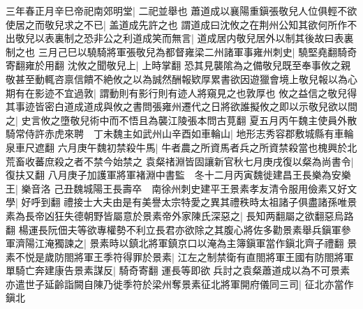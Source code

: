 三年春正月辛巳帝祀南郊明堂|{
	二祀並舉也}
蕭道成以襄陽重鎭張敬兒人位俱輕不欲使居之而敬兒求之不已|{
	盖道成先許之也}
謂道成曰沈攸之在荆州公知其欲何所作不出敬兒以表裏制之恐非公之利道成笑而無言|{
	道成居内敬兒居外以制其後故曰表裏制之也}
三月己巳以驍騎將軍張敬兒為都督雍梁二州諸軍事雍州刺史|{
	驍堅堯翻騎奇寄翻雍於用翻}
沈攸之聞敬兒上|{
	上時掌翻}
恐其見襲隂為之備敬兒既至奉事攸之親敬甚至動輒咨禀信饋不絶攸之以為誠然酬報欵厚累書欲因遊獵會境上敬兒報以為心期有在影迹不宜過敦|{
	謂動則有影行則有迹人將窺見之也敦厚也}
攸之益信之敬兒得其事迹皆密白道成道成與攸之書問張雍州遷代之日將欲誰擬攸之即以示敬兒欲以間之|{
	史言攸之墮敬兒術中而不悟且為襲江陵張本問古莧翻}
夏五月丙午魏主使員外散騎常侍許赤虎來聘　丁未魏主如武州山辛酉如車輪山|{
	地形志秀容郡敷城縣有車輪泉車尺遮翻}
六月庚午魏初禁殺牛馬|{
	牛者農之所資馬者兵之所資禁殺當也槐興於北荒畜收蕃庶殺之者不禁今始禁之}
袁粲禇淵皆固讓新官秋七月庚戌復以粲為尚書令|{
	復扶又翻}
八月庚子加護軍將軍褚淵中書監　冬十二月丙寅魏徙建昌王長樂為安樂王|{
	樂音洛}
己丑魏城陽王長壽卒　南徐州刺史建平王景素孝友清令服用儉素又好文學|{
	好呼到翻}
禮接士大夫由是有美譽太宗特愛之異其禮秩時太祖諸子俱盡諸孫唯景素為長帝凶狂失德朝野皆屬意於景素帝外家陳氏深惡之|{
	長知两翻屬之欲翻惡烏路翻}
楊運長阮佃夫等欲專權勢不利立長君亦欲除之其腹心將佐多勸景素舉兵鎭軍參軍濟陽江淹獨諫之|{
	景素時以鎮北將軍鎮京口以淹為主簿鎭軍當作鎭北齊子禮翻}
景素不悦是歲防閤將軍王季符得罪於景素|{
	江左之制禁衛有直閤將軍王國有防閤將軍}
單騎亡奔建康告景素謀反|{
	騎奇寄翻}
運長等即欲兵討之袁粲蕭道成以為不可景素亦遣世子延齡詣闕自陳乃徙季符於梁州奪景素征北將軍開府儀同三司|{
	征北亦當作鎭北}


